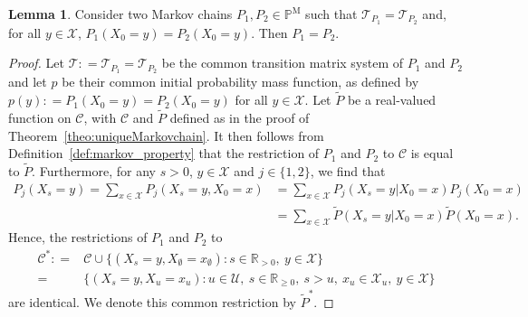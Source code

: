 \documentclass[10pt,a4paper]{paper}
\theoremstyle{definition}
\newtheorem{lemma}[theorem]{Lemma}
\newcommand{\reals}{\mathbb{R}}
\newcommand{\states}{\mathcal{X}}
\newcommand{\processes}{\mathbb{P}}
\newcommand{\mprocesses}{\processes^{\mathrm{M}}}
\newcommand{\coloneqq}{:\!=}
\begin{document}
\begin{lemma}\label{lemma:samepandTissameP}
Consider two Markov chains $P_1,P_2\in\mprocesses$ such that $\mathcal{T}_{P_1}=\mathcal{T}_{P_2}$ and, for all $y\in\states$, $P_1(X_0=y)=P_2(X_0=y)$. Then $P_1=P_2$.
\end{lemma}
\begin{proof}
Let $\mathcal{T}\coloneqq\mathcal{T}_{P_1}=\mathcal{T}_{P_2}$ be the common transition matrix system of $P_1$ and $P_2$ and let $p$ be their common initial probability mass function, as defined by $p(y)\coloneqq P_1(X_0=y)=P_2(X_0=y)$ for all $y\in\states$. Let $\tilde{P}$ be a real-valued function on $\mathcal{C}$, with $\mathcal{C}$ and $\tilde{P}$ defined as in the proof of Theorem~\ref{theo:uniqueMarkovchain}. It then follows from Definition~\ref{def:markov_property} that the restriction of $P_1$ and $P_2$ to $\mathcal{C}$ is equal to $\tilde{P}$. Furthermore, for any $s>0$, $y\in\states$ and $j\in\{1,2\}$, we find that
\begin{align*}
P_j(X_s=y)
=\sum_{x\in\states}P_j(X_s=y, X_0=x)
&=\sum_{x\in\states}P_j(X_s=y\vert X_0=x)P_j(X_0=x)\\
&=\sum_{x\in\states}\tilde{P}(X_s=y\vert X_0=x)\tilde{P}(X_0=x).
\end{align*}
Hence, the restrictions of $P_1$ and $P_2$ to
\begin{align*}
\mathcal{C}^*
\coloneqq&\mathcal{C}\cup
\{
(X_s=y,X_\emptyset=x_\emptyset)
\colon 
s\in\reals_{>0},~y\in\states
\}\\
=&\{
(X_s=y,X_u=x_u)
\colon 
u\in\mathcal{U},~s\in\reals_{\geq0},~s>u,~x_u\in\states_u,~y\in\states
\}
\end{align*}
are identical. We denote this common restriction by $\tilde{P}^*$.


\end{proof}
\end{document}
